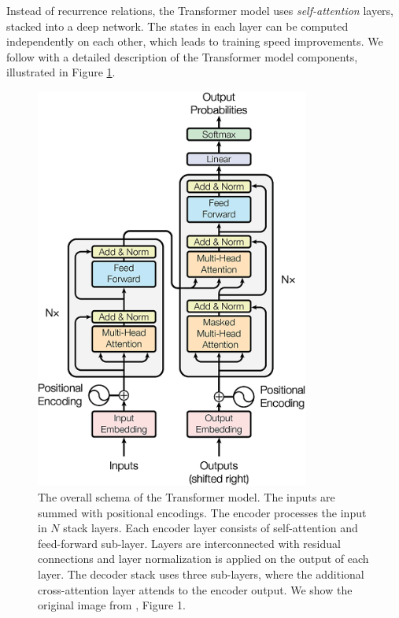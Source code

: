Instead of recurrence relations, the Transformer model uses
\emph{self-attention} layers, stacked into a deep network. The states in each
layer can be computed independently on each other, which leads to training
speed improvements. We follow with a detailed description of the Transformer
model components, illustrated in Figure \ref{fig:transformer}.

\begin{figure}
  \centering
  \includegraphics[width=9cm]{img/transformer.png}

  \caption{The overall schema of the Transformer model. The inputs are summed
    with positional encodings. The encoder processes the input in $N$ stack
    layers. Each encoder layer consists of self-attention and feed-forward
    sub-layer. Layers are interconnected with residual connections and layer
    normalization is applied on the output of each layer. The decoder stack
    uses three sub-layers, where the additional cross-attention layer attends
    to the encoder output. We show the original image from
    \citet{vaswani2017attention}, Figure 1.}
  \label{fig:transformer}
\end{figure}

